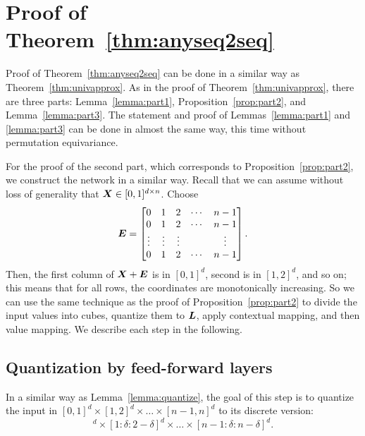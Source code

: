 
\section{Proof of Theorem~\ref{thm:anyseq2seq}}\label{sec:proof_anyseq2seq}
Proof of Theorem~\ref{thm:anyseq2seq} can be done in a similar way as Theorem~\ref{thm:univapprox}. As in the proof of Theorem~\ref{thm:univapprox}, there are three parts: Lemma~\ref{lemma:part1}, Proposition~\ref{prop:part2}, and Lemma~\ref{lemma:part3}. The statement and proof of Lemmas~\ref{lemma:part1} and \ref{lemma:part3} can be done in almost the same way, this time without permutation equivariance.

For the proof of the second part, which corresponds to Proposition~\ref{prop:part2}, we construct the network in a similar way.
Recall that we can assume without loss of generality that ${\bm{X}} \in [0,1]^{d \times n}$. Choose
\begin{equation*}
    {\bm{E}} = 
    \begin{bmatrix}
    0 & 1 & 2 & \cdots & n-1\\
    0 & 1 & 2 & \cdots & n-1\\
    \vdots & \vdots & \vdots & & \vdots\\
    0 & 1 & 2 & \cdots & n-1
    \end{bmatrix}.
\end{equation*}
Then, the first column of ${\bm{X}}+{\bm{E}}$ is in $[0,1]^d$, second is in $[1,2]^d$, and so on; this means that for all rows, the coordinates are monotonically increasing.
So we can use the same technique as the proof of Proposition~\ref{prop:part2} to divide the input values into cubes, quantize them to ${\bm{L}}$, apply contextual mapping, and then value mapping. We describe each step in the following.


\subsection{Quantization by feed-forward layers}
In a similar way as Lemma~\ref{lemma:quantize}, the goal of this step is to quantize the input in $[0,1]^d \times [1,2]^d \times \dots \times [n-1,n]^d$ to its discrete version:
\begin{equation*}
[0:\delta:1-\delta]^d \times [1:\delta:2-\delta]^d \times \dots \times [n-1:\delta:n-\delta]^d.
\end{equation*}

